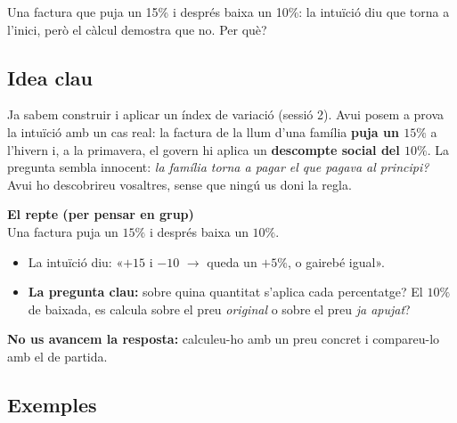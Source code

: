 %
{Una factura que puja un 15\% i després baixa un 10\%: la intuïció diu que torna a l'inici, però el càlcul demostra que no. Per què?}

\subsection{Idea clau}

Ja sabem construir i aplicar un índex de variació (sessió 2). Avui posem a prova la
intuïció amb un cas real: la factura de la llum d'una família \textbf{puja un $15\%$}
a l'hivern i, a la primavera, el govern hi aplica un \textbf{descompte social del
$10\%$}. La pregunta sembla innocent: \emph{la família torna a pagar el que pagava al
principi?} Avui ho descobrireu vosaltres, sense que ningú us doni la regla.

\begin{idea}
\textbf{El repte (per pensar en grup)}\\
Una factura puja un $15\%$ i després baixa un $10\%$.
\begin{itemize}[leftmargin=1.4em, itemsep=2pt]
  \item La intuïció diu: «$+15$ i $-10$ $\rightarrow$ queda un $+5\%$, o gairebé igual».
  \item \textbf{La pregunta clau:} sobre quina quantitat s'aplica cada percentatge? El
        $10\%$ de baixada, es calcula sobre el preu \emph{original} o sobre el preu
        \emph{ja apujat}?
\end{itemize}
\textbf{No us avancem la resposta:} calculeu-ho amb un preu concret i compareu-lo amb
el de partida.
\end{idea}

\subsection{Exemples}


